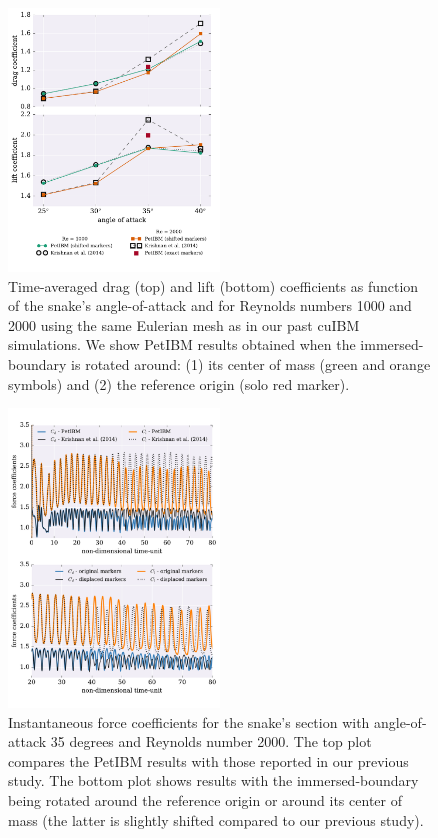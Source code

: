 \documentclass[9pt,twocolumn,twoside]{article}
\begin{document}
\begin{figure}[t]
\centering
\includegraphics[width=0.5\textwidth]{./figures/petibm/petibm011_forceCoefficientsVsAoA.pdf}
\caption{
Time-averaged drag (top) and lift (bottom) coefficients as function of the snake's angle-of-attack and for Reynolds numbers 1000 and 2000 using the same Eulerian mesh as in our past cuIBM simulations.
We show PetIBM results obtained when the immersed-boundary is rotated around: (1) its center of mass (green and orange symbols) and (2) the reference origin (solo red marker).}
\label{figure8}
\end{figure}



\begin{figure}[t]
\centering
\includegraphics[width=0.5\textwidth]{./figures/petibm/petibm011_forceCoefficientsRe2000AoA35.pdf}
\caption{
Instantaneous force coefficients for the snake's section with angle-of-attack 35 degrees and Reynolds number 2000.
The top plot compares the PetIBM results with those reported in our previous study.
The bottom plot shows results with the immersed-boundary being rotated around the reference origin or  around its center of mass (the latter is slightly shifted compared to our previous study).}
\label{figure9}
\end{figure}
\end{document}
